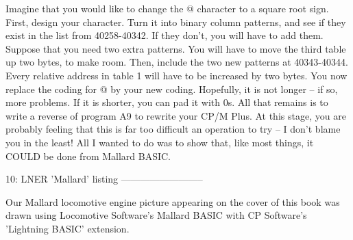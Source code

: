Imagine  that you would like to change the @ character to a square root  sign. 
First, design your character. Turn it into binary column patterns, and see  if 
they  exist in the list from 40258-40342. If they don't, you will have to  add 
them.  Suppose  that you need two extra patterns. You will have  to  move  the 
third table up two bytes, to make room. Then, include the two new patterns  at 
40343-40344.  Every relative address in table 1 will have to be  increased  by 
two bytes. You now replace the coding for @ by your new coding. Hopefully,  it 
is  not longer -- if so, more problems. If it is shorter, you can pad it  with 
0s. All that remains is to write a reverse of program A9 to rewrite your  CP/M 
Plus.  At this stage, you are probably feeling that this is far too  difficult 
an operation to try -- I don't blame you in the least! All I wanted to do  was 
to show that, like most things, it COULD be done from Mallard BASIC.


10: LNER 'Mallard' listing
--------------------------

Our Mallard locomotive engine picture appearing on the cover of this book  was 
drawn using Locomotive Software's Mallard BASIC with CP Software's  'Lightning 
BASIC' extension.

